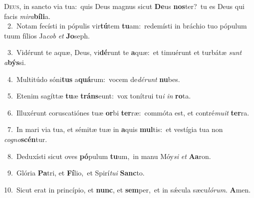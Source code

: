 \lettrine{\initial\textcolor{\initialcolor}{D}}{eus,} in sancto via tua:~\dagger quis Deus magnus sicut \textbf{De}\-us \textbf{nos}\-ter?~\star tu es Deus qui facis \textit{mi}\-\textit{ra}\textbf{bí}\textbf{li}a.\\
{\numbfont\textcolor{\numbcolor}{~2.}}~Notam fecísti in pópulis vir\-\textbf{tú}\-tem \textbf{tu}\-am:~\star redemísti in bráchio tuo pópulum tuum fílios Ja\textit{cob} \textit{et} \textbf{Jo}\-seph.\par
{\numbfont\textcolor{\numbcolor}{~3.}}~Vidérunt te aquæ, Deus, vi\-\textbf{dé}\-runt te \textbf{a}\-quæ:~\star et timuérunt et turbátæ \textit{sunt} \textit{a}\-\textbf{býs}si.\par
{\numbfont\textcolor{\numbcolor}{~4.}}~Multitúdo sóni\textbf{tus} a\-\textbf{quá}\-rum:~\star vocem de\-\textit{dé}\-\textit{runt} \textbf{nu}\-bes.\par
{\numbfont\textcolor{\numbcolor}{~5.}}~Etenim sagíttæ \textbf{tu}\-æ \textbf{tráns}\-eunt:~\star vox tonítrui tu\textit{i} \textit{in} \textbf{ro}\-ta.\par
{\numbfont\textcolor{\numbcolor}{~6.}}~Illuxérunt coruscatiónes tuæ \textbf{or}\-bi \textbf{ter}\-ræ:~\star commóta est, et contré\-\textit{mu}\-\textit{it} \textbf{ter}\-ra.\par
{\numbfont\textcolor{\numbcolor}{~7.}}~In mari via tua, et sémitæ tuæ in \textbf{a}\-quis \textbf{mul}\-tis:~\star et vestígia tua non \textit{co}\-\textit{gno}\textbf{scén}tur.\par
{\numbfont\textcolor{\numbcolor}{~8.}}~Deduxísti sicut oves \textbf{pó}\-pulum \textbf{tu}\-um,~\star in manu Móy\textit{si} \textit{et} \textbf{A}\-\textbf{a}ron.\par
{\numbfont\textcolor{\numbcolor}{~9.}}~Glória \textbf{Pa}\-tri, et \textbf{Fí}\-lio,~\star et Spirí\-\textit{tu}\-\textit{i} \textbf{Sanc}\-to.\par
{\numbfont\textcolor{\numbcolor}{10.}}~Sicut erat in princípio, et \textbf{nunc}\-, et \textbf{sem}\-per,~\star et in sǽcula sæcu\-\textit{ló}\-\textit{rum}. \textbf{A}\-men.\par
